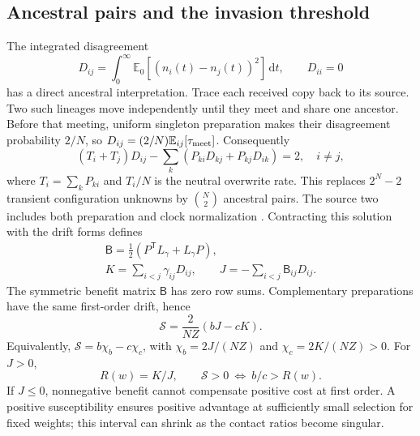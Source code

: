 \documentclass[aps,pre,reprint,amsmath,amssymb,longbibliography]{revtex4-2}
\newcommand{\E}{\mathbb E}
\newcommand{\T}{\mathsf T}
\newcommand{\dd}{\,\mathrm d}
\begin{document}
\subsection{Ancestral pairs and the invasion threshold}
\label{sec:pair-response}
The integrated disagreement
\begin{equation}
 D_{ij}=\int_0^\infty\E_0[(n_i(t)-n_j(t))^2]\dd t,\qquad D_{ii}=0
 \label{eq:disagreement}
\end{equation}
has a direct ancestral interpretation. Trace each received copy back
to its source. Two such lineages move independently until they meet
and share one ancestor. Before that meeting, uniform singleton
preparation makes their disagreement probability $2/N$, so
$D_{ij}=(2/N)\E_{ij}[\tau_{\rm meet}]$. Consequently
\begin{equation}
 (T_i+T_j)D_{ij}
 -\sum_k(P_{ki}D_{kj}+P_{kj}D_{ik})=2,\quad i\ne j,
 \label{eq:pair-system}
\end{equation}
where $T_i=\sum_kP_{ki}$ and $T_i/N$ is the neutral overwrite rate.
This replaces $2^N-2$ transient configuration unknowns by
$\binom N2$ ancestral pairs. The source two includes both preparation
and clock normalization
\cite{AllenEtAl2017,AllenEtAl2021,McAvoyAllen2021}.
Contracting this solution with the drift forms defines
\begin{equation}
 \begin{gathered}
 \mathsf B=\tfrac12(P^\T L_\gamma+L_\gamma P),\\
 K=\sum_{i<j}\gamma_{ij}D_{ij},\qquad
 J=-\sum_{i<j}\mathsf B_{ij}D_{ij}.
 \end{gathered}
 \label{eq:JK}
\end{equation}
The symmetric benefit matrix $\mathsf B$ has zero row sums. Complementary preparations
have the same first-order drift, hence
\begin{equation}
 \mathcal S=\frac{2}{NZ}(bJ-cK).
 \label{eq:criterion}
\end{equation}
Equivalently, $\mathcal S=b\chi_b-c\chi_c$, with
$\chi_b=2J/(NZ)$ and $\chi_c=2K/(NZ)>0$. For $J>0$,
\begin{equation}
 R(w)=K/J,\qquad \mathcal S>0\ \Longleftrightarrow\ b/c>R(w).
 \label{eq:threshold}
\end{equation}
If $J\le0$, nonnegative benefit cannot compensate positive cost at
first order. A positive susceptibility ensures positive advantage at
sufficiently small selection for fixed weights; this interval can
shrink as the contact ratios become singular.
\end{document}
